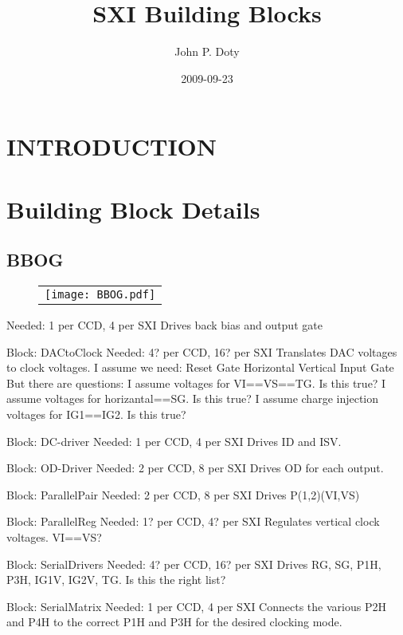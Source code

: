 \documentclass[a4paper,10pt]{report}
\author{John P. Doty}
\date{2009-09-23}
\title{SXI Building Blocks}
\begin{document}
\begin{titlepage}
\maketitle
\end{titlepage} 

\section{INTRODUCTION}

\section{Building Block Details}
\subsection{BBOG}

   \begin{figure}
   \begin{center}
   \begin{tabular}{c}
   \texttt{[image: BBOG.pdf]}
   \end{tabular}
   \end{center}
   \end{figure}
Needed: 1 per CCD, 4 per SXI
Drives back bias and output gate

Block: DACtoClock
Needed: 4? per CCD, 16? per SXI
Translates DAC voltages to clock voltages. I assume we need:
Reset Gate
Horizontal
Vertical
Input Gate
But there are questions:
I assume voltages for VI==VS==TG. Is this true?
I assume voltages for horizantal==SG. Is this true?
I assume charge injection voltages for IG1==IG2. Is this true?

Block: DC-driver
Needed: 1 per CCD, 4 per SXI
Drives ID and ISV.

Block: OD-Driver
Needed: 2 per CCD, 8 per SXI
Drives OD for each output.

Block: ParallelPair
Needed: 2 per CCD, 8 per SXI
Drives P(1,2)(VI,VS)

Block: ParallelReg
Needed: 1? per CCD, 4? per SXI
Regulates vertical clock voltages. VI==VS?

Block: SerialDrivers
Needed: 4? per CCD, 16? per SXI
Drives RG, SG, P1H, P3H, IG1V, IG2V, TG. Is this the right list?

Block: SerialMatrix
Needed: 1 per CCD, 4 per SXI
Connects the various P2H and P4H to the correct P1H and P3H for the desired clocking mode.
\end{document}
